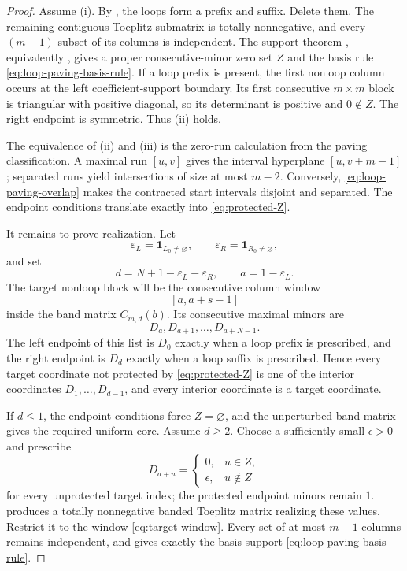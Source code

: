 \documentclass[11pt]{amsart}
\theoremstyle{definition}
\theoremstyle{remark}
\newcommand{\one}{\mathbf 1}
\begin{document}
\begin{proof}
Assume (i).  By , the loops form a prefix and suffix.  Delete them.  The remaining contiguous Toeplitz submatrix is totally nonnegative, and every $(m-1)$-subset of its columns is independent.  The support theorem \cite[Theorem~10]{CGQpaving}, equivalently , gives a proper consecutive-minor zero set $Z$ and the basis rule \eqref{eq:loop-paving-basis-rule}.  If a loop prefix is present, the first nonloop column occurs at the left coefficient-support boundary.  Its first consecutive $m\times m$ block is triangular with positive diagonal, so its determinant is positive and $0\notin Z$.  The right endpoint is symmetric.  Thus (ii) holds.

The equivalence of (ii) and (iii) is the zero-run calculation from the paving classification.  A maximal run $[u,v]$ gives the interval hyperplane $[u,v+m-1]$; separated runs yield intersections of size at most $m-2$.  Conversely, \eqref{eq:loop-paving-overlap} makes the contracted start intervals disjoint and separated.  The endpoint conditions translate exactly into \eqref{eq:protected-Z}.

It remains to prove realization.  Let
\[
 \varepsilon_L=\one_{L_0\ne\varnothing},
 \qquad
 \varepsilon_R=\one_{R_0\ne\varnothing},
\]
and set
\begin{equation}\label{eq:d-a-choice}
 d=N+1-\varepsilon_L-\varepsilon_R,
 \qquad
 a=1-\varepsilon_L.
\end{equation}
The target nonloop block will be the consecutive column window
\begin{equation}\label{eq:target-window}
 [a,a+s-1]
\end{equation}
inside the band matrix $C_{m,d}(b)$.  Its consecutive maximal minors are
\[
 D_a,D_{a+1},\ldots,D_{a+N-1}.
\]
The left endpoint of this list is $D_0$ exactly when a loop prefix is prescribed, and the right endpoint is $D_d$ exactly when a loop suffix is prescribed.  Hence every target coordinate not protected by \eqref{eq:protected-Z} is one of the interior coordinates $D_1,\ldots,D_{d-1}$, and every interior coordinate is a target coordinate.

If $d\le1$, the endpoint conditions force $Z=\varnothing$, and the unperturbed band matrix gives the required uniform core.  Assume $d\ge2$.  Choose a sufficiently small $\epsilon>0$ and prescribe
\[
 D_{a+u}=\begin{cases}
 0,&u\in Z,\\
 \epsilon,&u\notin Z
 \end{cases}
\]
for every unprotected target index; the protected endpoint minors remain $1$.   produces a totally nonnegative banded Toeplitz matrix realizing these values.  Restrict it to the window \eqref{eq:target-window}.  Every set of at most $m-1$ columns remains independent, and  gives exactly the basis support \eqref{eq:loop-paving-basis-rule}.


\end{proof}
\end{document}
